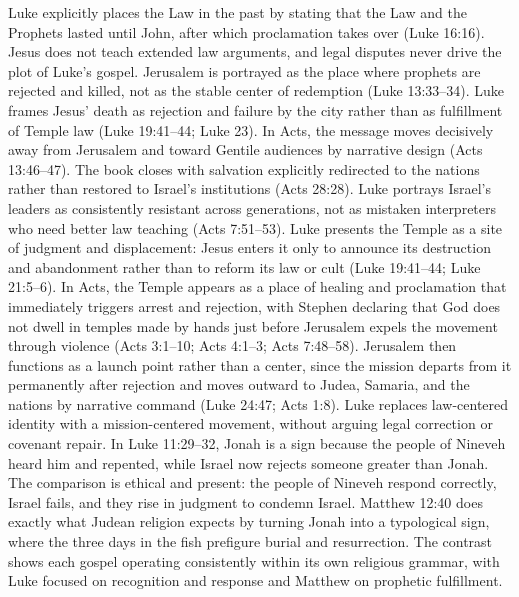 Luke explicitly places the Law in the past by stating that the Law and the Prophets lasted until John, after which proclamation takes over (Luke 16:16).
Jesus does not teach extended law arguments, and legal disputes never drive the plot of Luke's gospel.
Jerusalem is portrayed as the place where prophets are rejected and killed, not as the stable center of redemption (Luke 13:33--34).
Luke frames Jesus' death as rejection and failure by the city rather than as fulfillment of Temple law (Luke 19:41--44; Luke 23).
In Acts, the message moves decisively away from Jerusalem and toward Gentile audiences by narrative design (Acts 13:46--47).
The book closes with salvation explicitly redirected to the nations rather than restored to Israel's institutions (Acts 28:28).
Luke portrays Israel's leaders as consistently resistant across generations, not as mistaken interpreters who need better law teaching (Acts 7:51--53).
Luke presents the Temple as a site of judgment and displacement: Jesus enters it only to announce its destruction and abandonment rather than to reform its law or cult (Luke 19:41--44; Luke 21:5--6).
In Acts, the Temple appears as a place of healing and proclamation that immediately triggers arrest and rejection, with Stephen declaring that God does not dwell in temples made by hands just before Jerusalem expels the movement through violence (Acts 3:1--10; Acts 4:1--3; Acts 7:48--58).
Jerusalem then functions as a launch point rather than a center, since the mission departs from it permanently after rejection and moves outward to Judea, Samaria, and the nations by narrative command (Luke 24:47; Acts 1:8).
Luke replaces law-centered identity with a mission-centered movement, without arguing legal correction or covenant repair.
In Luke 11:29--32, Jonah is a sign because the people of Nineveh heard him and repented, while Israel now rejects someone greater than Jonah.
The comparison is ethical and present: the people of Nineveh respond correctly, Israel fails, and they rise in judgment to condemn Israel.
Matthew 12:40 does exactly what Judean religion expects by turning Jonah into a typological sign, where the three days in the fish prefigure burial and resurrection.
The contrast shows each gospel operating consistently within its own religious grammar, with Luke focused on recognition and response and Matthew on prophetic fulfillment.

